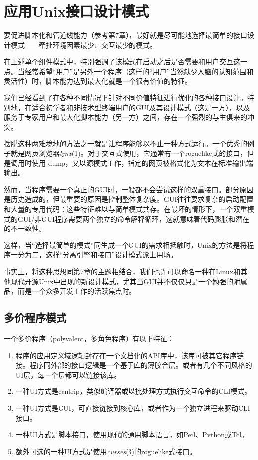 \documentclass[12pt,oneside]{book}
\begin{document}
\section{应用Unix接口设计模式}
要促进脚本化和管道线能力（参考第7章），最好就是尽可能地选择最简单的接口设计模式——牵扯环境因素最少、交互最少的模式。

在上述单个组件模式中，特别强调了该模式在启动之后是否需要和用户交互这一点。当经常希望“用户”是另外一个程序（这样的“用户”当然缺少人脑的认知范围和灵活性）时，脚本能力达到最大化就是一个很有价值的特征。

我们已经看到了在各种不同情况下针对不同价值特征进行优化的各种接口设计。特别地，在适合初学者和非技术型终端用户的GUI及其设计模式（这是一方），以及服务于专家用户和最大化脚本能力（另一方）之间，存在一个强烈的与生俱来的冲突。

摆脱这种两难境地的方法之一就是让程序能够以不止一种方式运行。一个优秀的例子就是网页浏览器\textit{lynx}(1)。对于交互式使用，它通常有一个roguelike式的接口，但是调用时使用-dump，又以源模式工作，指定的网页被格式化为文本在标准输出端输出。

然而，当程序需要一个真正的GUI时，一般都不会尝试这样的双重接口。部分原因是历史造成的，但最重要的原因是控制整体复杂度。GUI往往要求复杂的启动配置和大量的专用代码：这些特征难以与简单模式共存。在最坏的情形下，一个双重模式的GUI/非GUI程序需要两个独立的命令解释循环，这就意味着代码膨胀和潜在的不一致性。

这样，当“选择最简单的模式”同生成一个GUI的需求相抵触时，Unix的方法是将程序一分为二，这样“分离引擎和接口”设计模式派上用场。

事实上，将这种思想同第7章的主题相结合，我们也许可以命名一种在Linux和其他现代开源Unix中出现的新设计模式，尤其当GUI并不仅仅只是一个勉强的附属品，而是一个众多开发工作的活跃焦点时。

\subsection{多价程序模式}
一个多价程序（polyvalent，多角色程序）有以下特征：
\begin{enumerate}
\item 程序的应用定义域逻辑封存在一个文档化的API库中，该库可被其它程序链接。程序同外部的接口逻辑是一个基于库的薄胶合层。或者有几个不同风格的UI层，每一个层都可以链接该库。
\item 一种UI方式是cantrip，类似编译器或以批处理方式执行交互命令的CLI模式。
\item 一种UI方式是GUI，可直接链接到核心库，或者作为一个独立进程来驱动CLI接口。
\item 一种UI方式是脚本接口，使用现代的通用脚本语言，如Perl、Pvthon或Tcl。
\item 额外可选的一种UI方式是使用\textit{curses}(3)的roguelike式接口。
\end{enumerate}
\end{document}

